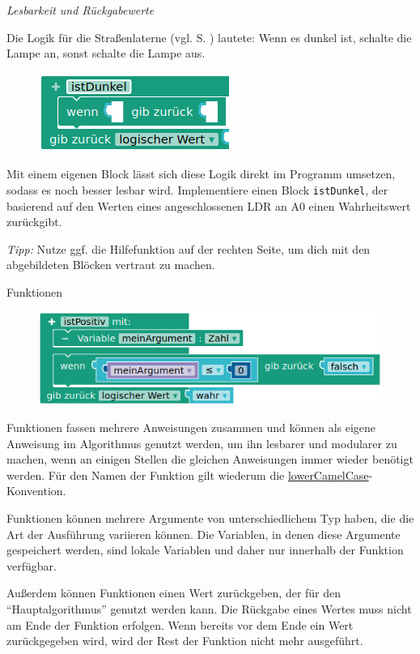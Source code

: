 \begin{aufgabe} \emph{Lesbarkeit und Rückgabewerte}
	
	Die Logik für die Straßenlaterne (vgl. S. \pageref{proj:strassenlampe}) lautete: Wenn es dunkel ist, schalte die Lampe an, sonst schalte die Lampe aus.
	
	\begin{figure}
		\centering
		\includegraphics[width=\linewidth]{./pics/istDunkel.png}
	\end{figure}
	Mit einem eigenen Block lässt sich diese Logik direkt im Programm umsetzen, sodass es noch besser lesbar wird. Implementiere einen Block \texttt{istDunkel}, der basierend auf den Werten eines angeschlossenen LDR an A0 einen Wahrheitswert zurückgibt.
	
	\emph{Tipp:} Nutze ggf. die \nepohilfe Hilfefunktion auf der rechten Seite, um dich mit den abgebildeten Blöcken vertraut zu machen.
\end{aufgabe}

\bigskip
\begin{zsfg}{Funktionen}
	
	\begin{figure}
		\centering
		\includegraphics[width=\linewidth]{./pics/istPositiv.png}
	\end{figure}
	Funktionen fassen mehrere Anweisungen zusammen und können als eigene Anweisung im Algorithmus genutzt werden, um ihn lesbarer und modularer zu machen, wenn an einigen Stellen die gleichen Anweisungen immer wieder benötigt werden. Für den Namen der Funktion gilt wiederum die \href{https://de.wikipedia.org/wiki/Binnenmajuskel#Programmiersprachen}{lowerCamelCase}-Konvention.
	
	Funktionen können mehrere Argumente von unterschiedlichem Typ haben, die die Art der Ausführung variieren können. Die Variablen, in denen diese Argumente gespeichert werden, sind lokale Variablen und daher nur innerhalb der Funktion verfügbar.
	
	Außerdem können Funktionen einen Wert zurückgeben, der für den \enquote{Hauptalgorithmus} genutzt werden kann. Die Rückgabe eines Wertes muss nicht am Ende der Funktion erfolgen. Wenn bereits vor dem Ende ein Wert zurückgegeben wird, wird der Rest der Funktion nicht mehr ausgeführt.
\end{zsfg}

